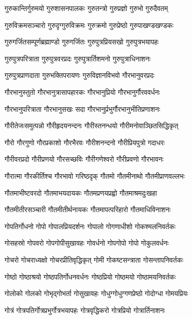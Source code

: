 \twolineshloka
{गुरुकान्तिर्गुरुमयो गुरुशासनपालकः}%
{गुरुतन्त्रो गुरुप्रज्ञो गुरुभो गुरुदैवतम्}%

\twolineshloka
{गुरुविक्रमसञ्चारो गुरुदृग्गुरुविक्रमः}%
{गुरुक्रमो गुरुप्रेष्ठो गुरुपाखण्डखण्डकः}%

\twolineshloka
{गुरुगर्जितसम्पूर्णब्रह्माण्डो गुरुगर्जितः}%
{गुरुपुत्रप्रियसखो गुरुपुत्रभयापहः}%

\twolineshloka
{गुरुपुत्रपरित्राता गुरुपुत्रवरप्रदः}%
{गुरुपुत्रार्तिशमनो गुरुपुत्राधिनाशनः}%

\twolineshloka
{गुरुपुत्रप्राणदाता गुरुभक्तिपरायणः}%
{गुरुविज्ञानविभवो गौरभानुवरप्रदः}%

\twolineshloka
{गौरभानुस्तुतो गौरभानुत्रासापहारकः}%
{गौरभानुप्रियो गौरभानुर्गौरववर्धनः}%

\twolineshloka
{गौरभानुपरित्राता गौरभानुसखः सदा}%
{गौरभानुर्प्रभुर्गौरभानुभीतिप्रणाशनः}%

\twolineshloka
{गौरीतेजःसमुत्पन्नो गौरीहृदयनन्दनः}%
{गौरीस्तनन्धयो गौरीमनोवाञ्छितसिद्धिकृत्}%

\twolineshloka
{गौरो गौरगुणो गौरप्रकाशो गौरभैरवः}%
{गौरीशनन्दनो गौरीप्रियपुत्रो गदाधरः}%

\twolineshloka
{गौरीवरप्रदो गौरीप्रणयो गौरसच्छविः}%
{गौरीगणेश्वरो गौरीप्रवणो गौरभावनः}%

\twolineshloka
{गौरात्मा गौरकीर्तिश्च गौरभावो गरिष्ठदृक्}%
{गौतमो गौतमीनाथो गौतमीप्राणवल्लभः}%

\twolineshloka
{गौतमाभीष्टवरदो गौतमाभयदायकः}%
{गौतमप्रणयप्रह्वो गौतमाश्रमदुःखहा}%

\twolineshloka
{गौतमीतीरसञ्चारी गौतमीतीर्थनायकः}%
{गौतमापत्परिहारो गौतमाधिविनाशनः}%

\twolineshloka
{गोपतिर्गोधनो गोपो गोपालप्रियदर्शनः}%
{गोपालो गोगणाधीशो गोकश्मलनिवर्तकः}%

\twolineshloka
{गोसहस्रो गोपवरो गोपगोपीसुखावहः}%
{गोवर्धनो गोपगोपो गोपो गोकुलवर्धनः}%

\twolineshloka
{गोचरो गोचराध्यक्षो गोचरप्रीतिवृद्धिकृत्}%
{गोमी गोकष्टसन्त्राता गोसन्तापनिवर्तकः}%

\twolineshloka
{गोष्ठो गोष्ठाश्रयो गोष्ठपतिर्गोधनवर्धनः}%
{गोष्ठप्रियो गोष्ठमयो गोष्ठामयनिवर्तकः}%

\twolineshloka
{गोलोको गोलको गोभृद्गोभर्ता गोसुखावहः}%
{गोधुग्गोधुग्गणप्रेष्ठो गोदोग्धा गोमयप्रियः}%

\twolineshloka
{गोत्रं गोत्रपतिर्गोत्रप्रभुर्गोत्रभयापहः}%
{गोत्रवृद्धिकरो गोत्रप्रियो गोत्रार्तिनाशनः}%

